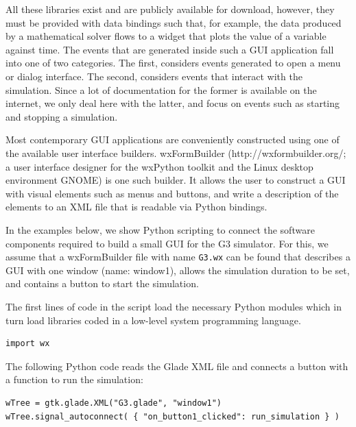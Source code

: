 \documentclass[12pt]{article}
\begin{document}
{All these libraries exist and are publicly available for download,
however, they must be provided with data bindings such that, for
example, the data produced by a mathematical solver flows to a widget
that plots the value of a variable against time.  The events that are
generated inside such a GUI application fall into one of two
categories.  The first, considers events generated to open a menu or
dialog interface.  The second, considers events that interact with the
simulation.  Since a lot of documentation for the former is available
on the internet, we only deal here with the latter, and focus on
events such as starting and stopping a simulation.

Most contemporary GUI applications are conveniently constructed using
one of the available user interface builders.  wxFormBuilder
(http://wxformbuilder.org/; a user interface designer for the wxPython
toolkit and the Linux desktop environment GNOME) is one such builder.
It allows the user to construct a GUI with visual elements such as
menus and buttons, and write a description of the elements to an XML
file that is readable via Python bindings.



In the examples below, we show Python scripting to connect the
software components required to build a small GUI for the G3
simulator.  For this, we assume that a wxFormBuilder file with name
{\tt G3.wx} can be found that describes a GUI with one window (name:
window1), allows the simulation duration to be set, and contains a
button to start the simulation.

The first lines of code in the script load the necessary Python
modules which in turn load libraries coded in a low-level system
programming language.

{\footnotesize
  \resetlinenumber
  \linenumbers
\begin{verbatim}
import wx
\end{verbatim}
}

The following Python code reads the Glade XML file and connects a
button with a function to run the simulation:

{\footnotesize
  \resetlinenumber[5]
  \linenumbers
\begin{verbatim}
wTree = gtk.glade.XML("G3.glade", "window1")
wTree.signal_autoconnect( { "on_button1_clicked": run_simulation } )
\end{verbatim}
}

}
\end{document}
